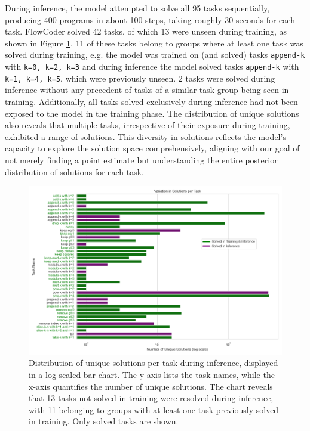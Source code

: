 During inference, the model attempted to solve all 95 tasks sequentially, producing 400 programs in about 100 steps, taking roughly 30 seconds for each task. FlowCoder solved 42 tasks, of which 13 were unseen during training, as shown in Figure \ref{fig:solution_variations_inference}. 11 of these tasks belong to groups where at least one task was solved during training, e.g. the model was trained on (and solved) tasks \texttt{append-k} with \texttt{k=0, k=2, k=3} and during inference the model solved tasks \texttt{append-k} with \texttt{k=1, k=4, k=5}, which were previously unseen. 2 tasks were solved during inference without any precedent of tasks of a similar task group being seen in training. Additionally, all tasks solved exclusively during inference had not been exposed to the model in the training phase.
The distribution of unique solutions also reveals that multiple tasks, irrespective of their exposure during training, exhibited a range of solutions. 
This diversity in solutions reflects the model's capacity to explore the solution space comprehensively, aligning with our goal of not merely finding a point estimate but understanding the entire posterior distribution of solutions for each task.

\begin{figure}
    \centering
    \includegraphics[width=\textwidth]{../img/plot_solution_variations_depth_3_48_tasks2023-12-07 22:24:45_inference.png}
    \caption{Distribution of unique solutions per task during inference, displayed in a log-scaled bar chart. The y-axis lists the task names, while the x-axis quantifies the number of unique solutions. The chart reveals that 13 tasks not solved in training were resolved during inference, with 11 belonging to groups with at least one task previously solved in training. Only solved tasks are shown.}
    \label{fig:solution_variations_inference}
    \end{figure}

